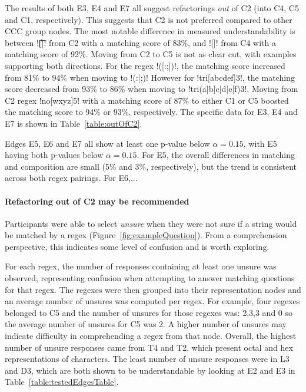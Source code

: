 The results of both E3, E4 and E7 all suggest refactorings \emph{out} of C2 (into C4, C5 and C1, respectively).  This suggests that C2 is not preferred compared to other CCC group nodes.  The most notable difference in measured understandability is between \cverb![\t\r\f\n ]! from C2 with a matching score of 83\%, and \cverb![\s]! from C4 with a matching score of 92\%.  Moving from C2 to C5 is not as clear cut, with examples supporting both directions.  For the regex \cverb!([:;])!, the matching score increased from 81\% to 94\% when moving to \cverb!(:|;)!  However for \cverb!tri[abcdef]3!, the matching score decreased from 93\% to 86\% when moving to \cverb!tri(a|b|c|d|e|f)3!.  Moving from C2 regex \cverb!no[wxyz]5! with a matching score of 87\% to either C1 or C5 boosted the matching score to 94\% or 93\%, respectively.  The specific data for E3, E4 and E7 is shown in Table~\ref{table:outOfC2}.



Edges E5, E6 and E7 all show at least one p-value below $\alpha = 0.15$, with E5 having both p-values below $\alpha = 0.15$.  For E5, the overall differences in matching and composition are small (5\% and 3\%, respectively), but the trend is consistent across both regex pairings.  For E6,...

\paragraph{Refactoring out of C2 may be recommended}


Participants were able to select \emph{unsure} when they were not sure if a string would be matched by a regex (Figure~\ref{fig:exampleQuestion}). From a comprehension perspective, this indicates some level of confusion and is worth exploring.



For each regex, the number of responses containing at least one unsure was observed, representing confusion when attempting to answer matching questions for that regex.
The regexes were then grouped into their representation nodes and an average number of unsures was computed per regex.  For example, four regexes belonged to C5 and the number of unsures for those regexes was: 2,3,3 and 0 so the average number of unsures for C5 was 2.
A higher number of unsures may indicate difficulty in comprehending a regex from that node.
Overall, the highest number of unsure responses came from T4 and T2, which present octal and hex representations of characters. The least number of unsure responses were in L3 and D3, which are both shown to be understandable by looking at E2 and E3 in Table~\ref{table:testedEdgesTable}.

